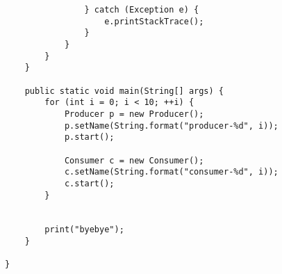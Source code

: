 \begin{lstlisting}
                } catch (Exception e) {
                    e.printStackTrace();
                }
            }
        }
    }

    public static void main(String[] args) {
        for (int i = 0; i < 10; ++i) {
            Producer p = new Producer();
            p.setName(String.format("producer-%d", i));
            p.start();

            Consumer c = new Consumer();
            c.setName(String.format("consumer-%d", i));
            c.start();
        }


        print("byebye");
    }

}
\end{lstlisting}


